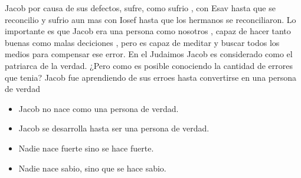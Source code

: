 \documentclass[conference]{IEEEtran}
\begin{document}
Jacob por causa de sus defectos, sufre, como sufrio , con Esav hasta que se reconcilio y sufrio aun mas con Iosef
hasta que los hermanos se reconciliaron.
Lo importante es que Jacob era una persona como nosotros , capaz de hacer tanto buenas como malas deciciones , pero es capaz de meditar y buscar todos los medios para compensar ese error. 
En el Judaimos Jacob es considerado como el patriarca de la verdad.  ¿Pero como es posible conociendo la cantidad de errores que tenia? Jacob fue aprendiendo de sus erroes hasta convertirse en una persona de verdad

\begin{itemize}
\item Jacob no  nace como una persona de verdad.
\item Jacob se desarrolla hasta ser una persona de verdad.
\item Nadie nace fuerte sino se hace fuerte.
\item Nadie nace sabio, sino que se hace sabio.
\end{itemize}




\end{document}
